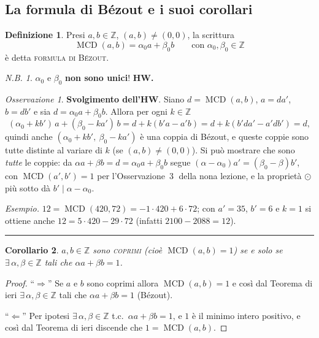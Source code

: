 \documentclass[11pt,a4paper]{article}
\newcommand{\Z}{\mathbb{Z}}
\theoremstyle{definition}
\newtheorem{definizione}{Definizione}[section]
\theoremstyle{plain}
\newtheorem{corollario}[definizione]{Corollario}
\theoremstyle{remark}
\newtheorem*{nb}{N.B.}
\newtheorem*{osservazione}{Osservazione}
\begin{document}
\subsection{La formula di Bézout e i suoi corollari}

\begin{definizione}
Presi $a,b\in\Z$, $(a,b)\neq(0,0)$, la scrittura
\[
\operatorname{MCD}(a,b)=\alpha_0a+\beta_0b\qquad\text{con }\alpha_0,\beta_0\in\Z
\]
è detta \textsc{formula di Bézout}.
\end{definizione}

\begin{nb}
$\alpha_0$ e $\beta_0$ \textbf{non sono unici}! \quad \textbf{HW.}
\end{nb}

\begin{osservazione}
\textbf{Svolgimento dell'HW}. 
Siano $d=\operatorname{MCD}(a,b)$, $a=da'$, $b=db'$ e sia $d=\alpha_0a+\beta_0b$. Allora per ogni $k\in\Z$
\[
(\alpha_0+kb')\,a+(\beta_0-ka')\,b=d+k(b'a-a'b)=d+k(b'da'-a'db')=d,
\]
quindi anche $(\alpha_0+kb',\ \beta_0-ka')$ è una coppia di Bézout, e queste coppie sono tutte distinte al variare di $k$ (se $(a,b)\neq(0,0)$). Si può mostrare che sono \emph{tutte} le coppie: da $\alpha a+\beta b=d=\alpha_0a+\beta_0b$ segue $(\alpha-\alpha_0)a'=(\beta_0-\beta)b'$, con $\operatorname{MCD}(a',b')=1$ per l'Osservazione~\textcircled{\small3} della nona lezione, e la proprietà $\odot$ più sotto dà $b'\mid\alpha-\alpha_0$.

\emph{Esempio.} $12=\operatorname{MCD}(420,72)=-1\cdot420+6\cdot72$; con $a'=35$, $b'=6$ e $k=1$ si ottiene anche $12=5\cdot420-29\cdot72$ (infatti $2100-2088=12$).
\end{osservazione}

\bigskip\hrule\bigskip

\begin{corollario}\label{cor:coprimi}
$a,b\in\Z$ sono \textsc{coprimi} (cioè $\operatorname{MCD}(a,b)=1$) se e solo se $\exists\,\alpha,\beta\in\Z$ tali che $\alpha a+\beta b=1$.
\end{corollario}

\begin{proof}
``$\Rightarrow$'' Se $a$ e $b$ sono coprimi allora $\operatorname{MCD}(a,b)=1$ e così dal Teorema di ieri $\exists\,\alpha,\beta\in\Z$ tali che $\alpha a+\beta b=1$ (Bézout).

``$\Leftarrow$'' Per ipotesi $\exists\,\alpha,\beta\in\Z$ t.c.\ $\alpha a+\beta b=1$, e $1$ è il minimo intero positivo, e così dal Teorema di ieri discende che $1=\operatorname{MCD}(a,b)$. \qedhere
\end{proof}
\end{document}
